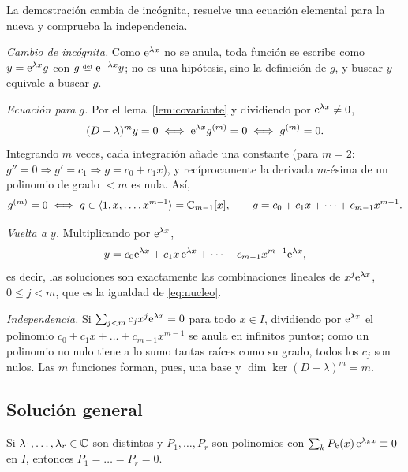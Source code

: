 \documentclass[11pt,twoside]{article}
\newcommand\gen[1]{\langle#1\rangle}
\begin{document}
\begin{demostracion}
La demostración cambia de incógnita, resuelve una ecuación elemental para la nueva y comprueba la independencia.
\begin{pasos}
\item \emph{Cambio de incógnita.} Como $\mathrm{e}^{\lambda x}$ no se anula, toda función se escribe como $y=\mathrm{e}^{\lambda x}g$ con
$g\defeq\e^{-\lambda x}y$; no es una hipótesis, sino la definición de $g$, y buscar $y$ equivale a buscar $g$.
\item \emph{Ecuación para $g$.} Por el lema~\ref{lem:covariante} y dividiendo por $\mathrm{e}^{\lambda x}\neq0$,
\begin{equation*}
(D-\lambda)^my=0\iff\mathrm{e}^{\lambda x}g^{(m)}=0\iff g^{(m)}=0.
\end{equation*}
Integrando $m$ veces, cada integración añade una constante (para $m=2$: $g''=0\Rightarrow g'=c_1\Rightarrow g=c_0+c_1x$), y
recíprocamente la derivada $m$-ésima de un polinomio de grado $<m$ es nula. Así,
\begin{equation*}
g^{(m)}=0\iff g\in\gen{1,x,\dots,x^{m-1}}=\C_{m-1}[x],\qquad g=c_0+c_1x+\dots+c_{m-1}x^{m-1}.
\end{equation*}
\item \emph{Vuelta a $y$.} Multiplicando por $\mathrm{e}^{\lambda x}$,
\begin{equation*}
y=c_0\mathrm{e}^{\lambda x}+c_1x\,\mathrm{e}^{\lambda x}+\dots+c_{m-1}x^{m-1}\mathrm{e}^{\lambda x},
\end{equation*}
es decir, las soluciones son exactamente las combinaciones lineales de $x^j\mathrm{e}^{\lambda x}$, $0\le j<m$, que es la igualdad
de \eqref{eq:nucleo}.
\item \emph{Independencia.} Si $\sum_{j<m}c_jx^j\mathrm{e}^{\lambda x}=0$ para todo $x\in I$, dividiendo por $\mathrm{e}^{\lambda x}$ el
polinomio $c_0+c_1x+\dots+c_{m-1}x^{m-1}$ se anula en infinitos puntos; como un polinomio no nulo tiene a lo sumo tantas
raíces como su grado, todos los $c_j$ son nulos. Las $m$ funciones forman, pues, una base y $\dim\ker(D-\lambda)^m=m$.
\end{pasos}
\end{demostracion}

\subsection{Solución general}

\begin{lema}[Independencia]\label{lem:indep}
Si $\lambda_1,\dots,\lambda_r\in\mathbb{C}$ son distintas y $P_1,\dots,P_r$ son polinomios con $\sum_kP_k(x)\,\mathrm{e}^{\lambda_kx}\equiv0$ en
$I$, entonces $P_1=\dots=P_r=0$.
\end{lema}
\end{document}
